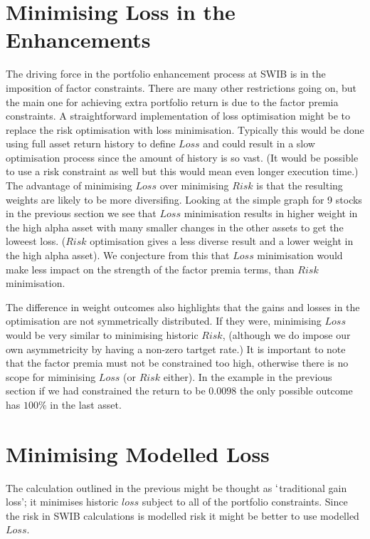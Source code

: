 \documentclass[12pt]{article}
\begin{document}
\section{Minimising Loss in the Enhancements}
The driving force in the portfolio enhancement process at SWIB is in the imposition
of factor constraints. There are many other restrictions going on, but the main one for 
achieving extra portfolio return is due to the factor premia constraints. A straightforward 
implementation of loss optimisation might be to replace the risk optimisation with loss minimisation.
Typically this would be done using full asset return history to define $Loss$ and could 
result in a slow optimisation process since the amount of history is so vast. (It would be possible 
to use a risk constraint as well but this would mean even longer execution time.) The advantage of
minimising $Loss$ over minimising $Risk$ is that the resulting weights are likely
to be more diversifing. Looking at the simple graph for 9 stocks in the previous section we see that
$Loss$ minimisation results in higher weight in the high alpha asset with many 
smaller changes in the other assets to get the loweest loss. ($Risk$ optimisation gives a less diverse
result and a lower weight in the high alpha asset). We conjecture from this that $Loss$ minimisation 
would make less impact on the strength of the factor premia terms, than $Risk$ minimisation. 

The difference in weight outcomes also
highlights that the gains and losses in the optimisation are not symmetrically
distributed. If they were, minimising $Loss$ would be very similar to minimising historic $Risk$, (although
we do impose our own asymmetricity by having a non-zero tartget rate.) It is important
to note that the factor premia must not be constrained too high, otherwise there is no scope 
for miminising $Loss$ (or $Risk$ either). In the example in the previous section 
if we had constrained the return to be $0.0098$ the only possible outcome has $100\%$ in 
the last asset.
\section{Minimising Modelled Loss}
The calculation outlined in the previous might be thought as $`$traditional gain loss'; it
minimises historic $loss$ subject to all of the portfolio constraints. Since the risk in 
SWIB calculations is modelled risk it might be better to use modelled $Loss$.
\end{document}
